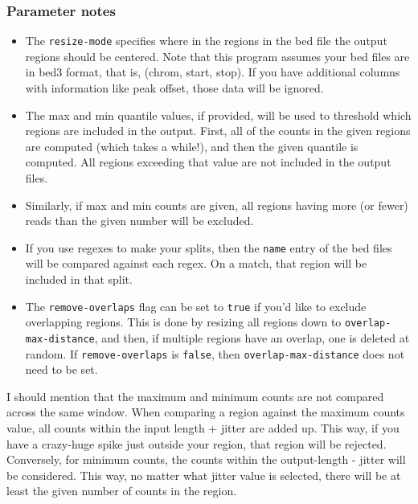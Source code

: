 \documentclass{article}
\begin{document}
\subsubsection{Parameter notes}

\begin{itemize}
    \item The \texttt{resize-mode} specifies where in the regions in the bed file the output regions should be centered. Note that this program assumes your bed files are in bed3 format, that is, (chrom, start, stop). If you have additional columns with information like peak offset, those data will be ignored.
    \item The max and min quantile values, if provided, will be used to threshold which regions are included in the output. First, all of the counts in the given regions are computed (which takes a while!), and then the given quantile is computed. All regions exceeding that value are not included in the output files.
    \item Similarly, if max and min counts are given, all regions having more (or fewer) reads than the given number will be excluded.
    \item If you use regexes to make your splits, then the \texttt{name} entry of the bed files will be compared against each regex. On a match, that region will be included in that split.
    \item The \texttt{remove-overlaps} flag can be set to \texttt{true} if you'd like to exclude overlapping regions. This is done by resizing all regions down to \texttt{overlap-max-distance}, and then, if multiple regions have an overlap, one is deleted at random. If \texttt{remove-overlaps} is \texttt{false}, then \texttt{overlap-max-distance} does not need to be set.
\end{itemize}

I should mention that the maximum and minimum counts are not compared across the same window.
When comparing a region against the maximum counts value, all counts within the input length + jitter are added up. This way, if you have a crazy-huge spike just outside your region, that region will be rejected.
Conversely, for minimum counts, the counts within the output-length - jitter will be considered. This way, no matter what jitter value is selected, there will be at least the given number of counts in the region.
\end{document}

